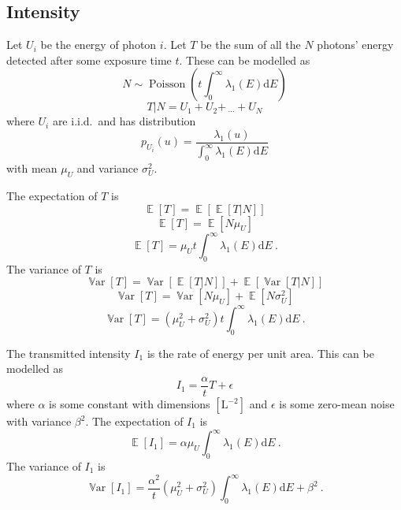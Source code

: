 \documentclass[12pt]{report}
\DeclareMathOperator{\expectation}{\mathbb{E}}
\DeclareMathOperator{\variance}{\mathbb{V}ar}
\DeclareMathOperator{\poisson}{Poisson}
\newcommand{\diff}{\mathrm{d}}
\newcommand{\dotdotdot}{_{\phantom{.}\cdots}}
\begin{document}
\subsection{Intensity}
Let $U_i$ be the energy of photon $i$. Let $T$ be the sum of all the $N$ photons' energy detected after some exposure time $t$. These can be modelled as
\begin{equation}
N\sim\poisson\left(t\int_0^{\infty}\lambda_1(E)\diff E\right)
\end{equation}
\begin{equation}
T|N = U_1 + U_2 + \dotdotdot + U_N
\end{equation}
where $U_i$ are i.i.d.~and has distribution
\begin{equation}
p_{U_i}(u) = \frac{\lambda_1(u)}{\int_0^{\infty}\lambda_1(E)\diff E}
\end{equation}
with mean $\mu_U$ and variance $\sigma_U^2$.

The expectation of $T$ is
\begin{equation}
\expectation[T] = \expectation[\expectation[T|N]]
\end{equation}
\begin{equation}
\expectation[T] = \expectation[N\mu_U]
\end{equation}
\begin{equation}
\expectation[T] = \mu_U t\int_0^{\infty}\lambda_1(E)\diff E \ .
\end{equation}
The variance of $T$ is
\begin{equation}
\variance[T] = \variance[\expectation[T|N]] + \expectation[\variance[T|N]]
\end{equation}
\begin{equation}
\variance[T] = \variance[N\mu_U] + \expectation[N\sigma_U^2]
\end{equation}
\begin{equation}
\variance[T] = \left(\mu_U^2+\sigma_U^2\right)t\int_0^{\infty}\lambda_1(E)\diff E \ .
\end{equation}

The transmitted intensity $I_1$ is the rate of energy per unit area. This can be modelled as
\begin{equation}
I_1 = \frac{\alpha}{t}T + \epsilon
\end{equation}
where $\alpha$ is some constant with dimensions $\left[\text{L}^{-2}\right]$ and $\epsilon$ is some zero-mean noise with variance $\beta^2$.
The expectation of $I_1$ is
\begin{equation}
\expectation[I_1] = \alpha\mu_U \int_0^{\infty}\lambda_1(E)\diff E \ .
\end{equation}
The variance of $I_1$ is
\begin{equation}
\variance[I_1] = \frac{\alpha^2}{t}\left(\mu_U^2+\sigma_U^2\right)\int_0^{\infty}\lambda_1(E)\diff E+\beta^2 \ .
\end{equation}
\end{document}
